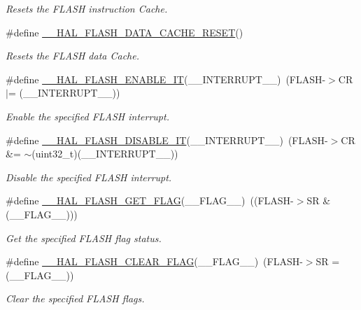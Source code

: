 \begin{DoxyCompactItemize}
\begin{DoxyCompactList}\small\item\em Resets the F\+L\+A\+SH instruction Cache. \end{DoxyCompactList}\item 
\#define \mbox{\hyperlink{group___f_l_a_s_h___exported___macros_ga3b94f4f103ddab361802c8defd3a9c34}{\+\_\+\+\_\+\+H\+A\+L\+\_\+\+F\+L\+A\+S\+H\+\_\+\+D\+A\+T\+A\+\_\+\+C\+A\+C\+H\+E\+\_\+\+R\+E\+S\+ET}}()
\begin{DoxyCompactList}\small\item\em Resets the F\+L\+A\+SH data Cache. \end{DoxyCompactList}\item 
\#define \mbox{\hyperlink{group___f_l_a_s_h___exported___macros_ga13fa137a911f02a2f94fb9fb0762a340}{\+\_\+\+\_\+\+H\+A\+L\+\_\+\+F\+L\+A\+S\+H\+\_\+\+E\+N\+A\+B\+L\+E\+\_\+\+IT}}(\+\_\+\+\_\+\+I\+N\+T\+E\+R\+R\+U\+P\+T\+\_\+\+\_\+)~(F\+L\+A\+SH-\/$>$CR $\vert$= (\+\_\+\+\_\+\+I\+N\+T\+E\+R\+R\+U\+P\+T\+\_\+\+\_\+))
\begin{DoxyCompactList}\small\item\em Enable the specified F\+L\+A\+SH interrupt. \end{DoxyCompactList}\item 
\#define \mbox{\hyperlink{group___f_l_a_s_h___exported___macros_ga1f40f507b5d4b3a4da68e4244a1097ee}{\+\_\+\+\_\+\+H\+A\+L\+\_\+\+F\+L\+A\+S\+H\+\_\+\+D\+I\+S\+A\+B\+L\+E\+\_\+\+IT}}(\+\_\+\+\_\+\+I\+N\+T\+E\+R\+R\+U\+P\+T\+\_\+\+\_\+)~(F\+L\+A\+SH-\/$>$CR \&= $\sim$(uint32\+\_\+t)(\+\_\+\+\_\+\+I\+N\+T\+E\+R\+R\+U\+P\+T\+\_\+\+\_\+))
\begin{DoxyCompactList}\small\item\em Disable the specified F\+L\+A\+SH interrupt. \end{DoxyCompactList}\item 
\#define \mbox{\hyperlink{group___f_l_a_s_h___exported___macros_ga0d3dd161fecc0e47c9e109c7c28672c1}{\+\_\+\+\_\+\+H\+A\+L\+\_\+\+F\+L\+A\+S\+H\+\_\+\+G\+E\+T\+\_\+\+F\+L\+AG}}(\+\_\+\+\_\+\+F\+L\+A\+G\+\_\+\+\_\+)~((F\+L\+A\+SH-\/$>$SR \& (\+\_\+\+\_\+\+F\+L\+A\+G\+\_\+\+\_\+)))
\begin{DoxyCompactList}\small\item\em Get the specified F\+L\+A\+SH flag status. \end{DoxyCompactList}\item 
\#define \mbox{\hyperlink{group___f_l_a_s_h___exported___macros_ga68e49c4675761e2ec35153e747de7622}{\+\_\+\+\_\+\+H\+A\+L\+\_\+\+F\+L\+A\+S\+H\+\_\+\+C\+L\+E\+A\+R\+\_\+\+F\+L\+AG}}(\+\_\+\+\_\+\+F\+L\+A\+G\+\_\+\+\_\+)~(F\+L\+A\+SH-\/$>$SR = (\+\_\+\+\_\+\+F\+L\+A\+G\+\_\+\+\_\+))
\begin{DoxyCompactList}\small\item\em Clear the specified F\+L\+A\+SH flags. \end{DoxyCompactList}\end{DoxyCompactItemize}


